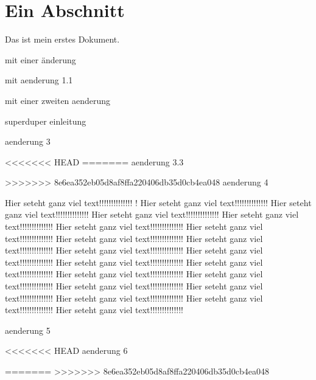 \documentclass{scrartcl}
\begin{document}
\section{Ein Abschnitt}
Das ist mein erstes Dokument.

mit einer änderung

mit aenderung 1.1

mit einer zweiten aenderung

superduper einleitung

aenderung 3

<<<<<<< HEAD
=======
aenderung 3.3

>>>>>>> 8e6ea352eb05d8af8ffa220406db35d0cb4ea048
aenderung 4

 Hier seteht ganz viel text!!!!!!!!!!!!!!
! Hier seteht ganz viel text!!!!!!!!!!!!!! Hier seteht ganz viel text!!!!!!!!!!!!!! Hier seteht ganz viel text!!!!!!!!!!!!!! Hier seteht ganz viel text!!!!!!!!!!!!!! Hier seteht ganz viel text!!!!!!!!!!!!!! Hier seteht ganz viel text!!!!!!!!!!!!!! Hier seteht ganz viel text!!!!!!!!!!!!!! Hier seteht ganz viel text!!!!!!!!!!!!!! Hier seteht ganz viel text!!!!!!!!!!!!!! Hier seteht ganz viel text!!!!!!!!!!!!!! Hier seteht ganz viel text!!!!!!!!!!!!!! Hier seteht ganz viel text!!!!!!!!!!!!!! Hier seteht ganz viel text!!!!!!!!!!!!!! Hier seteht ganz viel text!!!!!!!!!!!!!! Hier seteht ganz viel text!!!!!!!!!!!!!! Hier seteht ganz viel text!!!!!!!!!!!!!! Hier seteht ganz viel text!!!!!!!!!!!!!! Hier seteht ganz viel text!!!!!!!!!!!!!! Hier seteht ganz viel text!!!!!!!!!!!!!!


aenderung 5

<<<<<<< HEAD
aenderung 6

=======
>>>>>>> 8e6ea352eb05d8af8ffa220406db35d0cb4ea048
\end{document}
